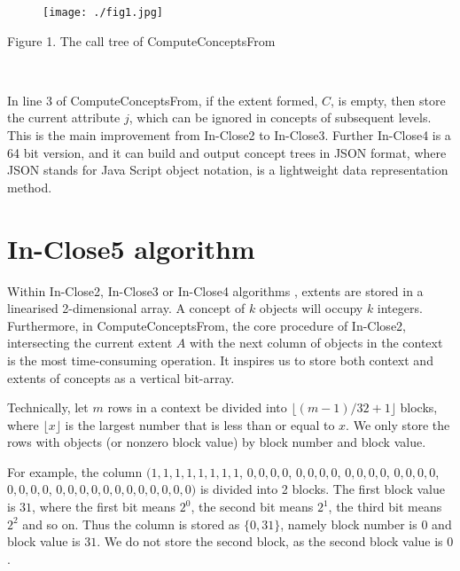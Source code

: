 \documentclass[11pt]{article}
\numberwithin{equation}{subsection}
\begin{document}
    \begin{figure}[htp] \centering
        \texttt{[image: ./fig1.jpg]}
        \label{figInClose2}
    \end{figure}
    \newpage
\centerline{Figure 1. The call tree of ComputeConceptsFrom}

\



In line 3 of ComputeConceptsFrom,  if the extent formed, $C$, is empty, then store the current attribute $j$, which can be ignored in  concepts of subsequent levels. This is the main improvement from In-Close2 to In-Close3. Further In-Close4 is a 64 bit version, and it can build and output concept trees in JSON format,  where JSON stands for Java Script object notation, is a lightweight data representation method.



\section{In-Close5 algorithm\label{s3}}


Within In-Close2, In-Close3 or In-Close4  algorithms \cite{ Andrews11,Andrews, Andrews17},  extents are stored in a linearised 2-dimensional  array.
A concept of $k$ objects will occupy  $k$ integers. Furthermore, in  ComputeConceptsFrom, the core procedure of  In-Close2,  intersecting the current extent $A$ with the next column of objects in the context is the most time-consuming operation. It inspires us to store both context and extents of
concepts as a vertical bit-array.


 Technically, let $m$ rows in a context be divided into $\lfloor(m-1)/32+1\rfloor$ blocks,  where $\lfloor x\rfloor$ is the largest number that is less than or equal to $x$.  We only store the rows with objects (or nonzero block value) by block number and block value.

For example,  the column $(1,1,1,1,1,1,1,1$, $0,0,0,0$, $0,0,0,0$,  $0,0,0,0$,   $0,0,0,0$,
 $0,0,0,0$,   $0,0,0,0,  0,0,0,0,0,0,0,0)$ is divided into 2 blocks.
 The first block value is $31$, where the first bit means $2^0$, the second bit means $2^1$, the third bit means $2^2$ and so on.
 Thus the column is stored as $\{0, 31\}$, namely block number is $0$ and block value is $31$. We do not store the second block, as the second block value is $0$.
\end{document}
